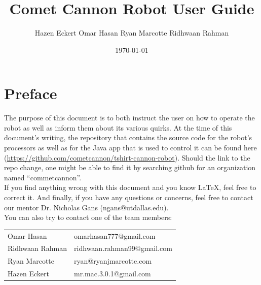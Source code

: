 \documentclass[letterpaper,12pt]{report}
\newcommand{\botname}{Comet Cannon }
\begin{document}
\title{\textbf{\botname Robot User Guide}}
\author{Hazen Eckert \hspace{3mm} Omar Hasan \hspace{3mm} Ryan Marcotte
        \hspace{3mm} Ridhwaan Rahman}

\date{\today}
\maketitle

\pagebreak

\section*{Preface}
The purpose of this document is to both instruct the user on how to operate the
robot as well as inform them about its various quirks. At the time of this
document's writing, the repository that contains the source code for the
robot's processors as well as for the Java app that is used to control it can
be found here (\url{https://github.com/cometcannon/tshirt-cannon-robot}).
Should the link to the repo change, one might be able to find it by searching
github for an organization named ``commetcannon''.\\

If you find anything wrong with this document and you know LaTeX, feel free to
correct it. And finally, if you have any questions or concerns, feel free to
contact our mentor Dr. Nicholas Gans (ngans@utdallas.edu).\\

You can also try to contact one of the team members:\\
\begin{center}
\begin{tabular}{l l}
    Omar Hasan & omarhasan777@gmail.com \\
    Ridhwaan Rahman & ridhwaan.rahman99@gmail.com \\
    Ryan Marcotte & ryan@ryanjmarcotte.com \\
    Hazen Eckert & mr.mac.3.0.1@gmail.com \\
\end{tabular}
\end{center}
\end{document}
